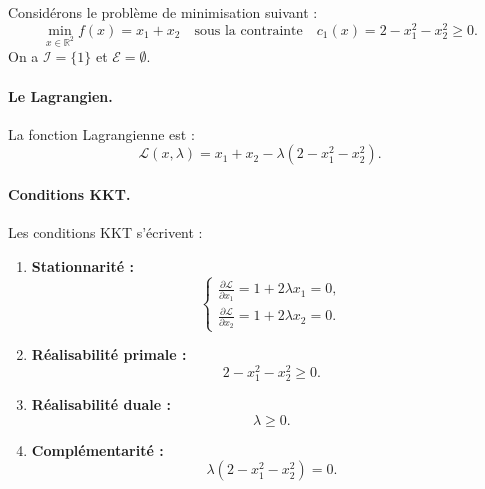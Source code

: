 \begin{exemple}
    Considérons le problème de minimisation suivant :
    \begin{equation}
        \min_{x \in \mathbb{R}^2} f(x) = x_1 + x_2 \quad \text{sous la contrainte} \quad c_1(x) = 2 - x_1^2 - x_2^2 \geq 0.
    \end{equation}
    On a $\mathcal{I} = \{1\}$ et $\mathcal{E} = \emptyset$.
    
    \paragraph{Le Lagrangien.}
    La fonction Lagrangienne est :
    \begin{equation}
        \mathcal{L}(x, \lambda) = x_1 + x_2 - \lambda(2 - x_1^2 - x_2^2).
    \end{equation}
    
    \paragraph{Conditions KKT.}
    Les conditions KKT s'écrivent :
    \begin{enumerate}
        \item \textbf{Stationnarité :}
        \begin{equation}
            \begin{cases}
                \displaystyle \frac{\partial \mathcal{L}}{\partial x_1} = 1 + 2\lambda x_1 = 0, \\[8pt]
                \displaystyle \frac{\partial \mathcal{L}}{\partial x_2} = 1 + 2\lambda x_2 = 0.
            \end{cases}
        \end{equation}
        
        \item \textbf{Réalisabilité primale :}
        \begin{equation}
            2 - x_1^2 - x_2^2 \geq 0.
        \end{equation}
        
        \item \textbf{Réalisabilité duale :}
        \begin{equation}
            \lambda \geq 0.
        \end{equation}
        
        \item \textbf{Complémentarité :}
        \begin{equation}
            \lambda(2 - x_1^2 - x_2^2) = 0.
        \end{equation}
    \end{enumerate}
    

\end{exemple}
